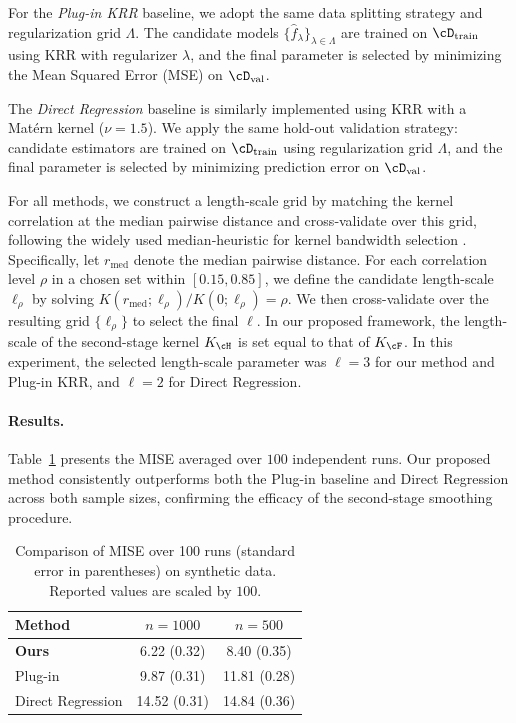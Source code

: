 \documentclass[english,11pt]{article}
\begin{document}
For the \textit{Plug-in KRR} baseline, we adopt the same data splitting strategy and regularization grid $\Lambda$. The candidate models $\{\hat f_\lambda\}_{\lambda\in\Lambda}$ are trained on $\cD_{\text{train}}$ using KRR with regularizer \(\lambda\), and the final parameter is selected by minimizing the Mean Squared Error (MSE) on $\cD_{\text{val}}$.

The \textit{Direct Regression} baseline is similarly implemented using KRR with a Mat\'ern kernel ($\nu=1.5$).
We apply the same hold-out validation strategy: candidate estimators are trained on $\cD_{\text{train}}$ using regularization grid $\Lambda$, and the final parameter is selected by minimizing prediction error on $\cD_{\text{val}}$.

For all methods, we construct a length‑scale grid by matching the kernel correlation at the median pairwise distance and cross‑validate over this grid, following the widely used median‑heuristic for kernel bandwidth selection \citep{garreau2017large,gretton2012kernel}.
Specifically, let $r_{\mathrm{med}}$ denote the median pairwise distance. For each correlation level $\rho$ in a chosen set within $[0.15, 0.85]$, we define the candidate length-scale $\ell_\rho$ by solving $K(r_{\mathrm{med}};\ell_\rho)/K(0;\ell_\rho)=\rho$.
We then cross-validate over the resulting grid $\{\ell_\rho\}$ to select the final $\ell$.
In our proposed framework, the length-scale of the second-stage kernel $K_\cH$ is set equal to that of $K_\cF$.
In this experiment, the selected length-scale parameter was $\ell = 3$ for our method and Plug-in KRR, and $\ell = 2$ for Direct Regression.

\paragraph{Results.}
Table~\ref{table:MISE_synthetic} presents the MISE averaged over $100$ independent runs.
Our proposed method consistently outperforms both the Plug-in baseline and Direct Regression across both sample sizes, confirming the efficacy of the second-stage smoothing procedure.

\begin{table}[h]
    \centering
    \caption{Comparison of MISE over 100 runs (standard error in parentheses) on synthetic data. Reported values are scaled by $100$.}
    \label{table:MISE_synthetic}
    \vspace{0.2cm}
    \begin{tabular}{@{}lcc@{}}
        \toprule
        Method & $n=1000$ & $n=500$ \\
        \midrule
        \textbf{Ours}            & 6.22 (0.32)  & 8.40 (0.35)  \\
        Plug-in                  & 9.87 (0.31)  & 11.81 (0.28) \\
        Direct Regression        & 14.52 (0.31) & 14.84 (0.36) \\
        \bottomrule
    \end{tabular}
\end{table}
\end{document}
